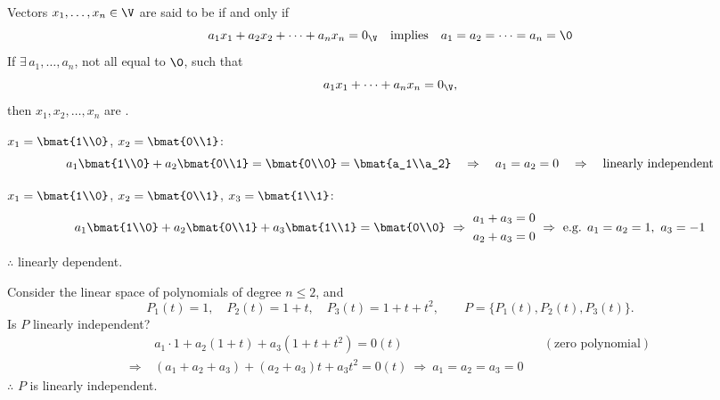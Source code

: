 \begin{definition}
Vectors $x_1,\dots,x_n\in\V$ are said to be  if and only if
\[ a_1x_1+a_2x_2+\dots+a_nx_n = 0_{\V} \quad\text{implies}\quad a_1=a_2=\dots=a_n=\0 \]
If $\exists\, a_1,\dots,a_n$, not all equal to $\0$, such that
\[ a_1x_1+\dots+a_nx_n = 0_{\V}, \]
then $x_1,x_2,\dots,x_n$ are .
\end{definition}

\begin{example}
$x_1=\bmat{1\\0}$, $x_2=\bmat{0\\1}$:
\[
a_1\bmat{1\\0}+a_2\bmat{0\\1} = \bmat{0\\0} = \bmat{a_1\\a_2}
\quad\Rightarrow\quad a_1=a_2=0 \quad\Rightarrow\quad \text{linearly independent}
\]
\end{example}

\begin{example}
$x_1=\bmat{1\\0}$, $x_2=\bmat{0\\1}$, $x_3=\bmat{1\\1}$:
\[
a_1\bmat{1\\0}+a_2\bmat{0\\1}+a_3\bmat{1\\1} = \bmat{0\\0}
\ \Rightarrow\
\begin{aligned} a_1+a_3&=0\\ a_2+a_3&=0 \end{aligned}
\ \Rightarrow\
\text{e.g. } a_1=a_2=1,\ a_3=-1
\]
$\therefore$ linearly dependent.
\end{example}

\begin{example}
Consider the linear space of polynomials of degree $n\le2$, and
\[
P_1(t)=1, \quad P_2(t)=1+t, \quad P_3(t)=1+t+t^2, \qquad P=\{P_1(t),P_2(t),P_3(t)\}.
\]
Is $P$ linearly independent?
\begin{align*}
& a_1\cdot1+a_2(1+t)+a_3(1+t+t^2) = 0(t) && (\text{zero polynomial})\\
\Rightarrow\ & (a_1+a_2+a_3)+(a_2+a_3)t+a_3t^2 = 0(t) \ \Rightarrow\ a_1=a_2=a_3=0
\end{align*}
$\therefore$ $P$ is linearly independent.
\end{example}

